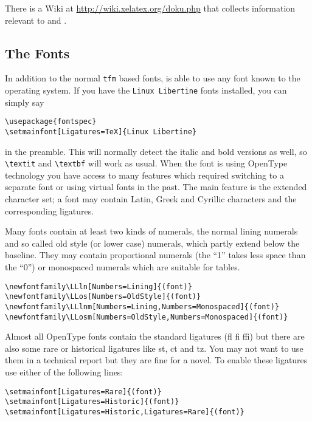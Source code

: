 There is a Wiki at \url{http://wiki.xelatex.org/doku.php} that collects
information relevant to  and .

\subsection{The Fonts} \label{sec:fontspec}

In addition to the normal \texttt{tfm} based fonts,  is able
to use any font known to the operating system. If you have the \texttt{Linux
Libertine} fonts installed, you can simply say

\begin{code}
\begin{verbatim}
\usepackage{fontspec}
\setmainfont[Ligatures=TeX]{Linux Libertine}
\end{verbatim}
\end{code}
%
in the preamble. This will normally detect the italic and bold versions as
well, so \verb|\textit| and \verb|\textbf| will work as usual. When the
font is using OpenType technology you have access to many features which
required switching to a separate font or using virtual fonts in the past.
The main feature is the extended character set; a font may contain Latin,
Greek and Cyrillic characters and the corresponding ligatures.

Many fonts contain at least two kinds of numerals, the normal lining
numerals and so called old style (or lower case) numerals, which partly
extend below the baseline. They may contain proportional numerals (the ``1''
takes less space than the ``0'') or monospaced numerals which are suitable
for tables.

\begin{code}
\begin{verbatim}
\newfontfamily\LLln[Numbers=Lining]{(font)}
\newfontfamily\LLos[Numbers=OldStyle]{(font)}
\newfontfamily\LLlnm[Numbers=Lining,Numbers=Monospaced]{(font)}
\newfontfamily\LLosm[Numbers=OldStyle,Numbers=Monospaced]{(font)}
\end{verbatim}
\end{code}

Almost all OpenType fonts contain the standard ligatures (fl fi ffi) but
there are also some rare or historical ligatures like st, ct and tz. You may
not want to use them in a technical report but they are fine for a novel. To
enable these ligatures use either of the following lines:

\begin{code}
\begin{verbatim}
\setmainfont[Ligatures=Rare]{(font)}
\setmainfont[Ligatures=Historic]{(font)}
\setmainfont[Ligatures=Historic,Ligatures=Rare]{(font)}
\end{verbatim}
\end{code}

